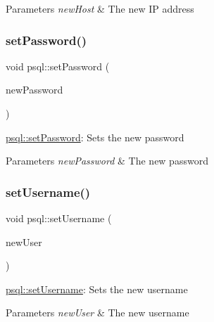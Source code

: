 \begin{DoxyParams}{Parameters}
{\em new\+Host} & The new IP address \\
\hline
\end{DoxyParams}
\mbox{\label{classpsql_a6c29350037550b7e5a5bb8f439c405f3}} 
\subsubsection{\texorpdfstring{set\+Password()}{setPassword()}}
{\footnotesize\ttfamily void psql\+::set\+Password (\begin{DoxyParamCaption}\item[{Q\+String}]{new\+Password }\end{DoxyParamCaption})}



\hyperlink{classpsql_a6c29350037550b7e5a5bb8f439c405f3}{psql\+::set\+Password}\+: Sets the new password 


\begin{DoxyParams}{Parameters}
{\em new\+Password} & The new password \\
\hline
\end{DoxyParams}
\mbox{\label{classpsql_a1488a9e4909abd172651b7be240342cb}} 
\subsubsection{\texorpdfstring{set\+Username()}{setUsername()}}
{\footnotesize\ttfamily void psql\+::set\+Username (\begin{DoxyParamCaption}\item[{Q\+String}]{new\+User }\end{DoxyParamCaption})}



\hyperlink{classpsql_a1488a9e4909abd172651b7be240342cb}{psql\+::set\+Username}\+: Sets the new username 


\begin{DoxyParams}{Parameters}
{\em new\+User} & The new username \\
\hline
\end{DoxyParams}
\mbox{\label{classpsql_a9a9c4c858ae22eac8a9a4572b16500f5}} 
